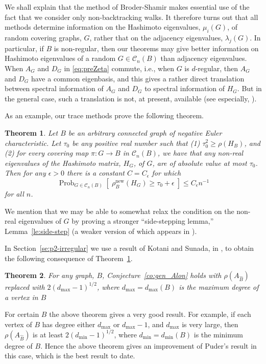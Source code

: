 \documentclass{memo-l}
\theoremstyle{plain}
\newtheorem{theorem}{Theorem}[section]
\theoremstyle{definition}
\numberwithin{section}{chapter}
\numberwithin{equation}{chapter}
\newcommand{\prob}[2]{{\Prob}_{#1}{\left[\; #2\; \right]}}
\DeclareMathOperator{\Prob}{Prob}
\newcommand{\from}{\colon}
\newcommand{\rhonew}{\rho^{\mathrm{new}}}
\theoremstyle{plain}
\theoremstyle{definition}
\newcommand\cC{\mathcal{C}}
\begin{document}
We shall explain that 
the method of Broder-Shamir \cite{broder} makes essential use of the
fact that
we consider only non-backtracking walks.  It therefore
turns out that all 
methods 
determine information
on the Hashimoto eigenvalues, $\mu_i(G)$, of random covering graphs, $G$,
rather that on the adjacency eigenvalues, $\lambda_j(G)$.
In particular, if $B$ is non-regular, then our theorems may give
better information on Hashimoto eigenvalues of a random $G\in\cC_n(B)$
than adjacency eigenvalues.  
When $A_G$ and $D_G$ in \eqref{eq:preZeta} commute, i.e., when 
$G$ is $d$-regular, then $A_G$ and $D_G$ have a common eigenbasis,
and this gives a rather direct translation between
spectral information of $A_G$ and $D_G$ to spectral information
of $H_G$.  But in the general case, such a translation is not, at 
present, available (see especially,
\cite{angel}).

As an example, our trace methods prove the following theorem.

\begin{theorem} 
\label{th:main}
Let $B$ be an arbitrary connected graph of negative Euler characteristic.
Let $\tau_0$ be any 
positive real number such that
(1) $\tau_0^2\ge\rho(H_B)$, and
(2) 
for every covering
map $\pi\from G\to B$ in $\cC_n(B)$, we have that any non-real eigenvalues
of the Hashimoto matrix, $H_G$, of $G$, are of absolute value at most
$\tau_0$.
Then for any $\epsilon>0$ there is a constant
$C=C_\epsilon$ for which 
$$
\prob{G\in \cC_n(B)}{\rhonew_B(H_G) \ge  \tau_0+\epsilon} \le C_\epsilon n^{-1}
$$
for all $n$.
\end{theorem}
We mention that we may be able to somewhat relax the condition on the non-real
eigenvalues of $G$ by proving a stronger ``side-stepping lemma,''
Lemma~\ref{le:side-step} (a weaker version of which appears
in \cite{friedman_alon}).

In Section~\ref{se:p2-irregular} we use a result of
Kotani and Sunada, in \cite{kotani}, to obtain the following
consequence of Theorem~\ref{th:main}.

\begin{theorem}
\label{th:d_max}
For any graph, $B$, Conjecture~\ref{co:gen_Alon}
holds with $\rho(A_{\widehat B})$ replaced with
$2(d_{\max{}}-1)^{1/2}$, where 
$d_{\max}=d_{\max}(B)$ is the maximum degree of a vertex in
$B$
\end{theorem}

For certain $B$ the above theorem gives a very good result.
For example,
if each vertex of $B$ has degree either $d_{\max{}}$ or 
$d_{\max{}}-1$, and $d_{\max{}}$ is very large, then 
$\rho(A_{\widehat B})$ is at
least $2(d_{\min{}}-1)^{1/2}$, where $d_{\min}=d_{\min}(B)$ is the minimum
degree of $B$.
Hence the above theorem gives an improvement of Puder's result \cite{puder}
in this case, which
is the best result to date.
\end{document}
